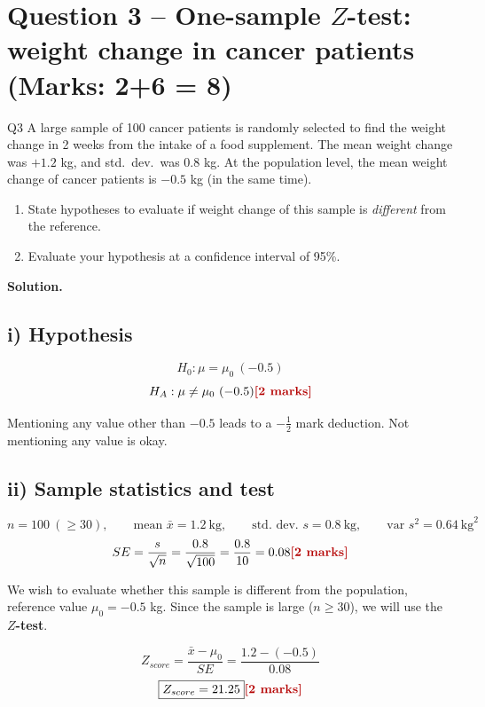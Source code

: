 \documentclass[11pt]{article}
\newcommand{\soln}{\par\noindent\textcolor{acolor}{\textbf{Solution.}}\quad}
\newcommand{\mk}[1]{\hfill\textcolor{markcolor}{\textbf{[#1]}}}
\begin{document}
\section{Question 3 -- One-sample $Z$-test: weight change in cancer patients (Marks: 2+6 = 8)}
\begin{question}{Q3}
A large sample of 100 cancer patients is randomly selected to find the weight change in 2 weeks from the intake of a food supplement. The mean weight change was $+1.2$ kg, and std.\ dev.\ was 0.8 kg. At the population level, the mean weight change of cancer patients is $-0.5$ kg (in the same time).
\begin{enumerate}[label=\roman*)]
\item State hypotheses to evaluate if weight change of this sample is \emph{different} from the reference.
\item Evaluate your hypothesis at a confidence interval of 95\%.
\end{enumerate}
\end{question}

\soln

\subsection*{i) Hypothesis}
\[
H_0: \mu = \mu_0\ (-0.5)
\]
\[
H_A: \mu \neq \mu_0\ (-0.5) \mk{2 marks}
\]

\begin{tcolorbox}[colback=gray!5, colframe=gray!60, title=Note (from original marking scheme)]
Mentioning any value other than $-0.5$ leads to a $-\frac{1}{2}$ mark deduction. Not mentioning any value is okay.
\end{tcolorbox}

\subsection*{ii) Sample statistics and test}
\[
n=100\ (\ge30), \qquad \text{mean } \bar{x}=1.2\ \text{kg}, \qquad \text{std.\ dev. } s=0.8\ \text{kg}, \qquad \text{var } s^2 = 0.64\ \text{kg}^2
\]
\[
SE = \frac{s}{\sqrt{n}} = \frac{0.8}{\sqrt{100}} = \frac{0.8}{10} = 0.08 \mk{2 marks}
\]

We wish to evaluate whether this sample is different from the population, reference value $\mu_0=-0.5$ kg. Since the sample is large ($n\ge30$), we will use the \textbf{$Z$-test}.

\[
Z_{score} = \frac{\bar{x}-\mu_0}{SE} = \frac{1.2-(-0.5)}{0.08}
\]
\[
\boxed{Z_{score} = 21.25} \mk{2 marks}
\]
\end{document}
